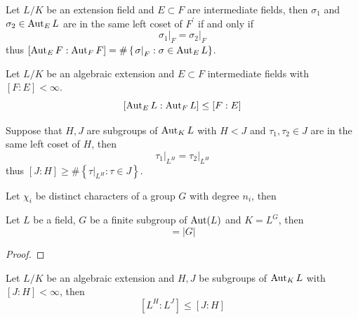 \begin{lemma}
    Let $L/K$ be an extension field and $E\subset F$ are intermediate fields, then $\sigma_1$ and $\sigma_2 \in \operatorname{\operatorname{Aut}}_E L$ are in the same left coset of $F^\prime$ if and only if
    \begin{equation*}
        \left.\sigma_1\right|_{F}
        =
        \left.\sigma_2\right|_{F}
    \end{equation*}
    thus $\left[\operatorname{\operatorname{Aut}}_E F: \operatorname{\operatorname{Aut}}_{F} F\right]=\# \left\{\left.\sigma\right|_F: \sigma \in \operatorname{\operatorname{Aut}}_E L\right\}$.
\end{lemma}


\begin{theorem}
    Let $L/K$ be an algebraic extension and $E\subset F$ intermediate fields with $\left[F:E\right]<\infty$.
    \begin{equation*}
        \left[\operatorname{\operatorname{Aut}}_E L:\operatorname{\operatorname{Aut}}_F L\right]\leq
        \left[F:E\right]
    \end{equation*}
\end{theorem}

\begin{lemma}
    Suppose that $H,J $ are subgroups of $\operatorname{\operatorname{Aut}}_K L$ with $H<J$ and $\tau_1,\tau_2\in J$ are in the same left coset of $H$, then
    \begin{equation*}
        \left.\tau_1\right|_{L^H}
        =
        \left.\tau_2\right|_{L^H}
    \end{equation*}
    thus $\left[J: H\right]\geq \# \left\{\left.\tau\right|_{L^H}: \tau \in J\right\}$.
\end{lemma}

\begin{theorem}
    Let $\chi_i$ be distinct characters of a group $G$ with degree $n_i$, then
\end{theorem}


\begin{theorem}
    Let $L$ be a field, $G$ be a finite subgroup of $\operatorname{\operatorname{Aut}}(L)$ and $K=L^G$, then
    \begin{equation*}
        [L: K]=|G|
    \end{equation*}
    \begin{proof}

    \end{proof}
\end{theorem}

\begin{corollary}
    Let $L/K$ be an algebraic extension and $H, J$ be subgroups of $\operatorname{\operatorname{Aut}}_K L$ with $[J: H]<\infty$, then
    \begin{equation*}
        \left[L^H: L^J\right] \leq[J: H]
    \end{equation*}
\end{corollary}






